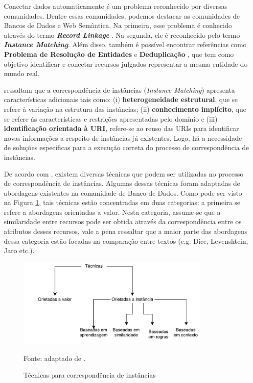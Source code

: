 Conectar dados automaticamente é um problema reconhecido por diversas comunidades. Dentre essas comunidades, podemos destacar as comunidades de Bancos de Dados e Web Semântica. Na primeira, esse problema é conhecido através do termo \textbf{\textit{Record Linkage}} \cite{gu2003record}. Na segunda, ele é reconhecido pelo termo \textbf{\textit{Instance Matching}}. Além disso, também é possível encontrar referências como \textbf{Problema de Resolução de Entidades} \cite{menestrina2005generic} e \textbf{Deduplicação} \cite{sarawagi2002interactive}, que tem como objetivo identificar e conectar recursos julgados representar a mesma entidade do mundo real.

 ressaltam que a correspondência de instâncias (\textit{Instance Matching}) apresenta características adicionais tais como: (i) \textbf{heterogeneidade estrutural}, que se refere à variação na estrutura das instâncias; (ii)\textbf{ conhecimento implícito}, que se refere às características e restrições  apresentadas pelo domínio e (iii) \textbf{identificação orientada à URI}, refere-se ao reuso das URIs para identificar novas informações a respeito de instâncias já existentes. Logo, há a necessidade de soluções específicas para a execução correta do processo de correspondência de instâncias. 

De acordo com \cite{castano2011ontology}, existem diversas técnicas que podem ser utilizadas no processo de correspondência de instâncias. Algumas dessas técnicas foram adaptadas de abordagens existentes na comunidade de Banco de Dados. Como pode ser visto na Figura \ref{fig:im_techniques}, tais técnicas estão concentradas em duas categorias: a primeira se refere a abordagens orientadas a valor. Nesta categoria, assume-se que a similaridade entre recursos pode ser obtida através da correspondência entre os atributos desses recursos, vale a pena ressaltar que a maior parte das abordagens dessa categoria estão focadas na comparação entre textos (e.g. Dice, Levenshtein, Jaro etc.).

\begin{figure}[!h]
	\centering
	\includegraphics[width=0.85\textwidth]{./imagens/im_techniques.pdf}
	\caption{Técnicas para correspondência de instâncias}
	\footnotesize{Fonte: adaptado de \cite{castano2011ontology}.}
	\label{fig:im_techniques}
\end{figure}

